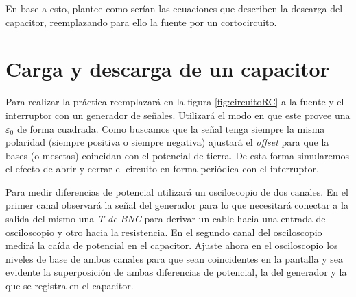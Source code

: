 \documentclass[laboratorio]{guia}
\begin{document}
En base a esto, plantee como serían las ecuaciones que describen la
descarga del capacitor, reemplazando para ello la fuente por un cortocircuito.


\section{Carga y descarga de un capacitor}
%
%
%
%

Para realizar la práctica reemplazará en la figura \ref{fig:circuitoRC} a la fuente y el interruptor con un generador de señales.
Utilizará el modo en que este provee una \(\varepsilon_0\) de forma cuadrada.
Como buscamos que la señal tenga siempre la misma polaridad (siempre positiva o siempre negativa) ajustará el \emph{offset} para que la bases (o mesetas) coincidan con el potencial de tierra.
De esta forma simularemos el efecto de abrir y cerrar el circuito en forma periódica con el interruptor.

Para medir diferencias de potencial utilizará un osciloscopio de dos canales.
En el primer canal observará la señal del generador para lo que necesitará conectar a la salida del mismo una \emph{T de BNC} para derivar un cable hacia una entrada del osciloscopio y otro hacia la resistencia.
En el segundo canal del osciloscopio medirá la caída de potencial en el capacitor.
Ajuste ahora en el osciloscopio los niveles de base de ambos canales para que sean coincidentes en la pantalla y sea evidente la superposición de ambas diferencias de potencial, la del generador y la que se registra en el capacitor.
\end{document}
